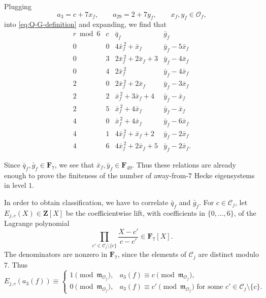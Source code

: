 \documentclass[11pt]{article}
\newcommand{\F}{\mathbf F}
\newcommand{\cO}{\mathcal O}
\theoremstyle{plain}
\theoremstyle{definition}
\theoremstyle{remark}
\numberwithin{equation}{section}
\begin{document}
Plugging \[ a_3 = c + 7 x_f, \qquad a_{29} = 2 + 7y_f, \qquad x_f,y_f \in \cO_f, \] into \eqref{eq:Q-G-definition} and expanding, we find that
\begin{equation}
\begin{array}{c|c|c|c}
r\bmod6 & c & \bar q_f & \bar g_f \\ \hline
0 & 0
  & 4\bar x_f^{\,2}+\bar x_f
  & \bar y_f-5\bar x_f \\[1mm]
0 & 3
  & 2\bar x_f^{\,2}+2\bar x_f+3
  & \bar y_f-4\bar x_f \\[1mm]
0 & 4
  & 2\bar x_f^{\,2}
  & \bar y_f-4\bar x_f \\ \hline
2 & 0
  & 2\bar x_f^{\,2}+2\bar x_f
  & \bar y_f-3\bar x_f \\[1mm]
2 & 2
  & \bar x_f^{\,2}+3\bar x_f+4
  & \bar y_f-\bar x_f \\[1mm]
2 & 5
  & \bar x_f^{\,2}+4\bar x_f
  & \bar y_f-\bar x_f \\ \hline
4 & 0
  & \bar x_f^{\,2}+4\bar x_f
  & \bar y_f-6\bar x_f \\[1mm]
4 & 1
  & 4\bar x_f^{\,2}+\bar x_f+2
  & \bar y_f-2\bar x_f \\[1mm]
4 & 6
  & 4\bar x_f^{\,2}+2\bar x_f+5
  & \bar y_f-2\bar x_f.
\end{array}\label{eq:qf-gf-xf-yf}
\end{equation}

Since $\bar q_f, \bar g_f\in \F_7$, we see that $\bar x_f, \bar y_f \in \F_{49}$. Thus these relations are already enough to prove the finiteness of the number of away-from-$7$ Hecke eigensystems in level $1$. 

In order to obtain classification, we have to correlate $\bar q_f$ and $\bar g_f$. For \(c\in\mathcal C_j\), let \(E_{j,c}(X)\in\mathbf Z[X]\) be the coefficientwise lift, with coefficients in \(\{0,\ldots,6\}\), of the Lagrange polynomial \[ \prod_{c'\in\mathcal C_j\setminus\{c\}} \frac{X-c'}{c-c'}\in\mathbf F_7[X]. \] The denominators are nonzero in \(\mathbf F_7\), since
the elements of \(\mathcal C_j\) are distinct modulo \(7\). Thus \[ E_{j,c}(a_3(f)) \equiv \begin{cases} 1\pmod{\mathfrak m_{\mathcal O_f}}, & a_3 (f)\equiv c\pmod{\mathfrak m_{\mathcal O_f}},\\ 0\pmod{\mathfrak m_{\mathcal O_f}}, & a_3(f) \equiv c'\pmod{\mathfrak m_{\mathcal O_f}} \text{ for some }c'\in\mathcal C_j\setminus\{c\}. \end{cases} \] 
\end{document}
